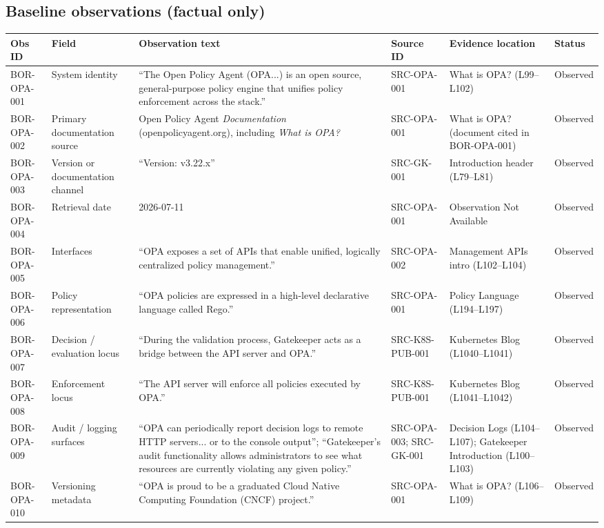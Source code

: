 \documentclass[11pt]{article}
\begin{document}
\subsection*{Baseline observations (factual only)}
\begin{longtable}{@{}L{1.1in}L{1.35in}L{2.35in}L{1.2in}L{1.5in}L{0.8in}@{}}
\toprule
Obs ID & Field & Observation text & Source ID & Evidence location & Status\\
\midrule
\endhead
BOR-OPA-001 & System identity & ``The Open Policy Agent (OPA...) is an open source, general-purpose policy engine that unifies policy enforcement across the stack.'' & SRC-OPA-001 & What is OPA? (L99--L102) & Observed\\
BOR-OPA-002 & Primary documentation source & Open Policy Agent \textit{Documentation} (openpolicyagent.org), including \textit{What is OPA?} & SRC-OPA-001 & What is OPA? (document cited in BOR-OPA-001) & Observed\\
BOR-OPA-003 & Version or documentation channel & ``Version: v3.22.x'' & SRC-GK-001 & Introduction header (L79--L81) & Observed\\
BOR-OPA-004 & Retrieval date & 2026-07-11 & SRC-OPA-001 & Observation Not Available & Observed\\
BOR-OPA-005 & Interfaces & ``OPA exposes a set of APIs that enable unified, logically centralized policy management.'' & SRC-OPA-002 & Management APIs intro (L102--L104) & Observed\\
BOR-OPA-006 & Policy representation & ``OPA policies are expressed in a high-level declarative language called Rego.'' & SRC-OPA-001 & Policy Language (L194--L197) & Observed\\
BOR-OPA-007 & Decision / evaluation locus & ``During the validation process, Gatekeeper acts as a bridge between the API server and OPA.'' & SRC-K8S-PUB-001 & Kubernetes Blog (L1040--L1041) & Observed\\
BOR-OPA-008 & Enforcement locus & ``The API server will enforce all policies executed by OPA.'' & SRC-K8S-PUB-001 & Kubernetes Blog (L1041--L1042) & Observed\\
BOR-OPA-009 & Audit / logging surfaces & ``OPA can periodically report decision logs to remote HTTP servers... or to the console output''; ``Gatekeeper's audit functionality allows administrators to see what resources are currently violating any given policy.'' & SRC-OPA-003; SRC-GK-001 & Decision Logs (L104--L107); Gatekeeper Introduction (L100--L103) & Observed\\
BOR-OPA-010 & Versioning metadata & ``OPA is proud to be a graduated Cloud Native Computing Foundation (CNCF) project.'' & SRC-OPA-001 & What is OPA? (L106--L109) & Observed\\
\bottomrule
\end{longtable}
\end{document}
